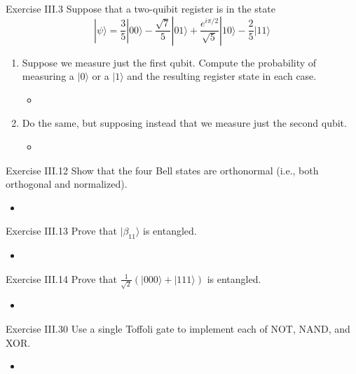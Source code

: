\documentclass[letterpaper]{article}
\begin{document}
\begin{section}{Exercise III.3}
  Suppose that a two-quibit register is in the state
  $$|\psi\rangle=\frac{3}{5}|00\rangle - \frac{\sqrt{7}}{5}|01\rangle+\frac{e^{i\pi/2}}{\sqrt{5}}|10\rangle-\frac{2}{5}|11\rangle$$
  \begin{enumerate}
    \item Suppose we measure just the first qubit. Compute the probability of measuring a $|0\rangle$ or a $|1\rangle$ and the resulting register state in each case.
    \begin{itemize}
      \item %
  \end{itemize}
    \item Do the same, but supposing instead that we measure just the second qubit.
    \begin{itemize}
      \item %
  \end{itemize}
  \end{enumerate}
\end{section}
\begin{section}{Exercise III.12}
  Show that the four Bell states are orthonormal (i.e., both orthogonal and normalized).
  \begin{itemize}
      \item %
  \end{itemize}
\end{section}
\begin{section}{Exercise III.13}
  Prove that $|\beta_{11}\rangle$ is entangled.
  \begin{itemize}
      \item %
  \end{itemize}
\end{section}
\begin{section}{Exercise III.14}
  Prove that $\frac{1}{\sqrt{2}}(|000\rangle + |111\rangle)$ is entangled.
  \begin{itemize}
      \item %
  \end{itemize}
\end{section}
\begin{section}{Exercise III.30}
  Use a single Toffoli gate to implement each of NOT, NAND, and XOR.
  \begin{itemize}
      \item %
  \end{itemize}
\end{section}
\end{document}
